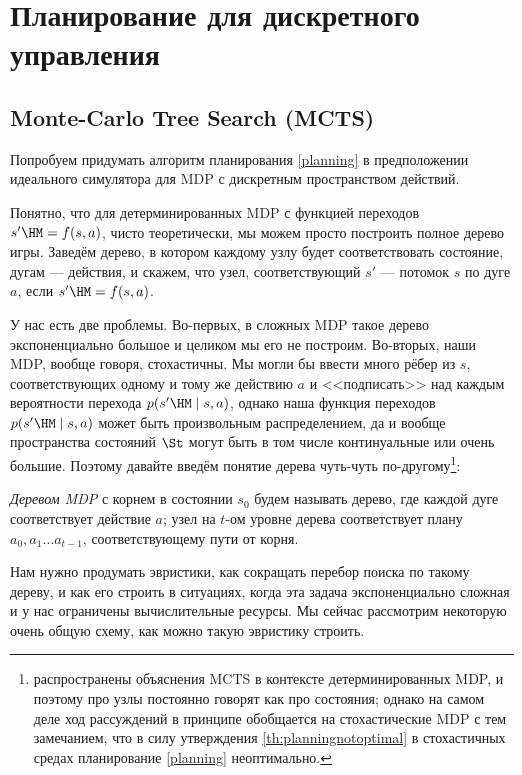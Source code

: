 \section{Планирование для дискретного управления}\label{mctssection}

\subsection{Monte-Carlo Tree Search (MCTS)}

Попробуем придумать алгоритм планирования \eqref{planning} в предположении идеального симулятора для MDP с дискретным пространством действий.

Понятно, что для детерминированных MDP с функцией переходов $s' \HM= f(s, a)$, чисто теоретически, мы можем просто построить полное дерево игры. Заведём дерево, в котором каждому узлу будет соответствовать состояние, дугам --- действия, и скажем, что узел, соответствующий $s'$ --- потомок $s$ по дуге $a$, если $s' \HM= f(s, a)$.

У нас есть две проблемы. Во-первых, в сложных MDP такое дерево экспоненциально большое и целиком мы его не построим. Во-вторых, наши MDP, вообще говоря, стохастичны. Мы могли бы ввести много рёбер из $s$, соответствующих одному и тому же действию $a$ и <<подписать>> над каждым вероятности перехода $p(s' \HM\mid s, a)$, однако наша функция переходов $p(s' \HM\mid s, a)$ может быть произвольным распределением, да и вообще пространства состояний $\St$ могут быть в том числе континуальные или очень большие. Поэтому давайте введём понятие дерева чуть-чуть по-другому\footnote{распространены объяснения MCTS в контексте детерминированных MDP, и поэтому про узлы постоянно говорят как про состояния; однако на самом деле ход рассуждений в принципе обобщается на стохастические MDP с тем замечанием, что в силу утверждения \ref{th:planningnotoptimal} в стохастичных средах планирование \eqref{planning} неоптимально.}:

\begin{definition}
\emph{Деревом MDP} с корнем в состоянии $s_0$ будем называть дерево, где каждой дуге соответствует действие $a$; узел на $t$-ом уровне дерева соответствует плану $a_0, a_1 \dots a_{t-1}$, соответствующему пути от корня.
\end{definition}

Нам нужно продумать эвристики, как сокращать перебор поиска по такому дереву, и как его строить в ситуациях, когда эта задача экспоненциально сложная и у нас ограничены вычислительные ресурсы. Мы сейчас рассмотрим некоторую очень общую схему, как можно такую эвристику строить.

